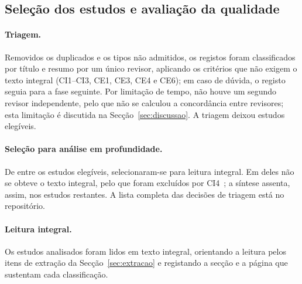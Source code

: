 \subsection{Seleção dos estudos e avaliação da qualidade}
\label{sec:selecao}

\paragraph{Triagem.} Removidos os duplicados e os tipos não admitidos, os
\nTriados{} registos foram classificados por título e resumo por um único revisor,
aplicando os critérios que não exigem o texto integral (CI1--CI3, CE1, CE3, CE4 e
CE6); em caso de dúvida, o registo seguia para a fase seguinte. Por limitação de
tempo, não houve um segundo revisor independente, pelo que não se calculou a
concordância entre revisores; esta limitação é discutida na
Secção~\ref{sec:discussao}. A triagem deixou \nElegiveis{} estudos elegíveis.

\paragraph{Seleção para análise em profundidade.} De entre os estudos elegíveis,
selecionaram-se \nTextoIntegral{} para leitura integral. Em \nNaoObtidos{} deles não
se obteve o texto integral, pelo que foram excluídos por
CI4~\cite{lohachab2019ecc, andy2017attack, hernandez2018fuzzing}; a síntese
assenta, assim, nos \nIncluidos{} estudos restantes. A lista completa das
decisões de triagem está no repositório.

\paragraph{Leitura integral.} Os \nIncluidos{} estudos analisados foram lidos em texto integral,
orientando a leitura pelos itens de extração da Secção~\ref{sec:extracao} e
registando a secção e a página que sustentam cada classificação.

